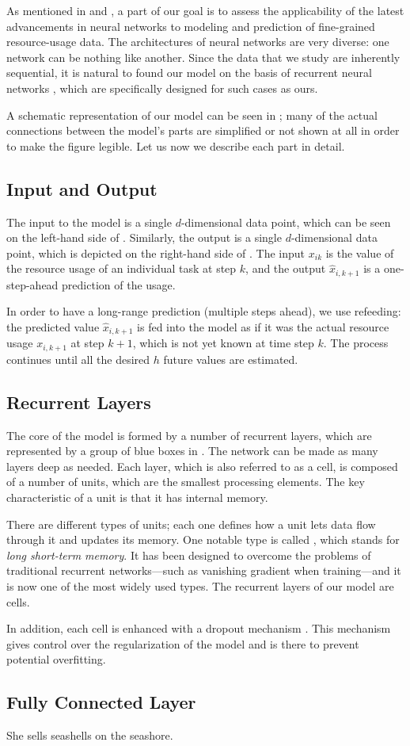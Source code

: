 
As mentioned in  and , a part of our goal is to
assess the applicability of the latest advancements in neural networks
\cite{goodfellow2016} to modeling and prediction of fine-grained resource-usage
data. The architectures of neural networks are very diverse: one network can be
nothing like another. Since the data that we study are inherently sequential, it
is natural to found our model on the basis of recurrent neural networks
\cite{goodfellow2016}, which are specifically designed for such cases as ours.

A schematic representation of our model can be seen in ; many of the
actual connections between the model's parts are simplified or not shown at all
in order to make the figure legible. Let us now we describe each part in detail.

\subsection{Input and Output}
The input to the model is a single $d$-dimensional data point, which can be seen
on the left-hand side of . Similarly, the output is a single
$d$-dimensional data point, which is depicted on the right-hand side of
. The input $x_{ik}$ is the value of the resource usage of an
individual task at step $k$, and the output $\hat{x}_{i,k + 1}$ is a
one-step-ahead prediction of the usage.

In order to have a long-range prediction (multiple steps ahead), we use
refeeding: the predicted value $\hat{x}_{i,k + 1}$ is fed into the model as if
it was the actual resource usage $x_{i,k + 1}$ at step $k + 1$, which is not
yet known at time step $k$. The process continues until all the desired $h$
future values are estimated.

\subsection{Recurrent Layers}
The core of the model is formed by a number of recurrent layers, which are
represented by a group of blue boxes in . The network can be made as
many layers deep as needed. Each layer, which is also referred to as a cell, is
composed of a number of units, which are the smallest processing elements. The
key characteristic of a unit is that it has internal memory.

There are different types of units; each one defines how a unit lets data flow
through it and updates its memory. One notable type is called 
\cite{hochreiter1997}, which stands for \emph{long short-term memory}. It has
been designed to overcome the problems of traditional recurrent networks---such
as vanishing gradient when training---and it is now one of the most widely used
types. The recurrent layers of our model are  cells.

In addition, each cell is enhanced with a dropout mechanism \cite{zaremba2014}.
This mechanism gives control over the regularization of the model and is there
to prevent potential overfitting.

\subsection{Fully Connected Layer}
She sells seashells on the seashore.
